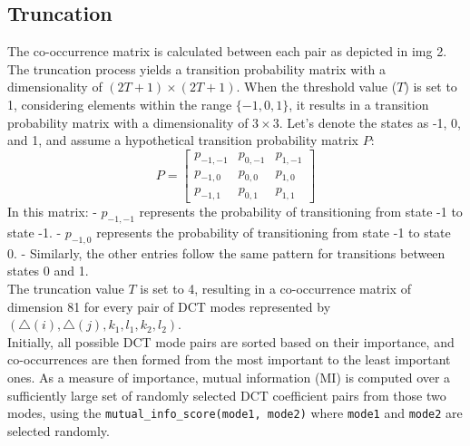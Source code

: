 \subsection{Truncation}
The co-occurrence matrix is calculated between each pair as depicted in img 2. The truncation process yields a transition probability matrix with a dimensionality of $(2T + 1) \times (2T + 1)$. When the threshold value ($T$) is set to 1, considering elements within the range $\{-1, 0, 1\}$, it results in a transition probability matrix with a dimensionality of $3 \times 3$.
Let's denote the states as -1, 0, and 1, and assume a hypothetical transition probability matrix $P$:
\[
    P = \begin{bmatrix}
        p_{-1,-1} & p_{0,-1} & p_{1,-1} \\
        p_{-1,0}  & p_{0,0}  & p_{1,0}  \\
        p_{-1,1}  & p_{0,1}  & p_{1,1}
    \end{bmatrix}
\]
In this matrix:
- $p_{-1,-1}$ represents the probability of transitioning from state -1 to state -1.
- $p_{-1,0}$ represents the probability of transitioning from state -1 to state 0.
- Similarly, the other entries follow the same pattern for transitions between states 0 and 1.\\
The truncation value $T$ is set to 4, resulting in a co-occurrence matrix of dimension 81 for every pair of DCT modes represented by $(\triangle(i), \triangle(j), k_1, l_1, k_2, l_2)$.\\
Initially, all possible DCT mode pairs are sorted based on their importance, and co-occurrences are then formed from the most important to the least important ones. As a measure of importance, mutual information (MI) is computed over a sufficiently large set of randomly selected DCT coefficient pairs from those two modes, using the \texttt{mutual\_info\_score(mode1, mode2)} where \texttt{mode1} and \texttt{mode2} are selected randomly.

